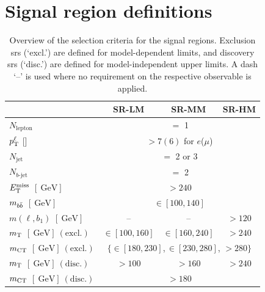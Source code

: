\section{Signal region definitions}\label{sec:signal_region_definitions}

\begin{table}
	\begin{center}
		\begin{tabular} {l | c c c }
			\toprule
				&  \textbf{SR-LM} & \textbf{SR-MM} & \textbf{SR-HM} \\
			\midrule
			$N_{\mathrm{lepton}}$ & \multicolumn{3}{c}{$=$ 1}\\
			$p^\ell_{\textrm{T}}$ [\GeV] & \multicolumn{3}{c}{ $>7(6)$ for $e$($\mu$)} \\
			$N_\mathrm{jet}$ & \multicolumn{3}{c}{$=$ 2 or 3}\\
			$N_{b\textrm{-jet}}$ &\multicolumn{3}{c}{$=$ 2} \\
			$E_{\textrm{T}}^{\textrm{miss}}$ $[\SI{}{\GeV}]$ & \multicolumn{3}{c}{$>240$}\\
			$m_{b\bar{b}}$  $[\SI{}{\GeV}]$ & \multicolumn{3}{c}{$\in [100,140]$}\\
			$m(\ell,b_1)$ $[\SI{}{\GeV}]$ & -- & -- & $>120$ \\
			\midrule
			$m_{\textrm{T}}$ $[\SI{}{\GeV}]~\mathrm{(excl.)}$&   $\in [100,160]$ & $\in [160,240]$ & $>240$ \\
			
			
			$m_{\textrm{CT}}$ $[\SI{}{\GeV}]~\mathrm{(excl.)}$ &\multicolumn{3}{c}{ $ \{ \in [180,230]$,\,$\in [230,280]$, $>280  \}$}\\
			
			\midrule
			$m_{\textrm{T}}$ $[\SI{}{\GeV}]~\mathrm{(disc.)}$&   $>100$ & $>160$ & $>240$ \\
			$m_{\textrm{CT}}$ $[\SI{}{\GeV}]~\mathrm{(disc.)}$ & \multicolumn{3}{c}{ $>180$}\\
			\bottomrule
		\end{tabular}
		\caption{Overview of the selection criteria for the signal regions. Exclusion \glspl{sr} (`excl.') are defined for model-dependent limits, and discovery \glspl{sr} (`disc.') are defined for model-independent upper limits. A dash `--' is used where no requirement on the respective observable is applied.} 
		\label{tab:SignalRegionDef}
	\end{center}
\end{table}

